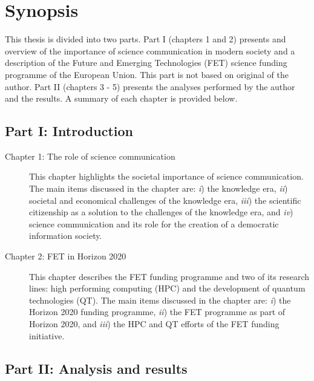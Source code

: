 \chapter*{Synopsis}
This thesis is divided into two parts. Part I (chapters 1 and 2) presents and overview of the importance of science communication in modern society and a description of the Future and Emerging Technologies (FET) science funding programme of the European Union. This part is not based on original of the author. Part II (chapters 3 - 5) presents the analyses performed by the author and the results. A summary of each chapter is provided below.

\section*{Part I: Introduction}

\begin{description}
 \item [Chapter 1: The role of science communication] This chapter highlights the societal importance of science communication. The main items discussed in the chapter are: \emph{i}) the knowledge era, \emph{ii}) societal and economical challenges of the knowledge era, \emph{iii}) the scientific citizenship as a solution to the challenges of the knowledge era, and \emph{iv}) science communication and its role for the creation of a democratic information society.

 \item [Chapter 2: FET in Horizon 2020] This chapter describes the FET funding programme and two of its research lines: high performing computing (HPC) and the development of quantum technologies (QT). The main items discussed in the chapter are: \emph{i}) the Horizon 2020 funding programme, \emph{ii}) the FET programme as part of Horizon 2020, and \emph{iii}) the HPC and QT efforts of the FET funding initiative.
\end{description}

\section*{Part II: Analysis and results}

